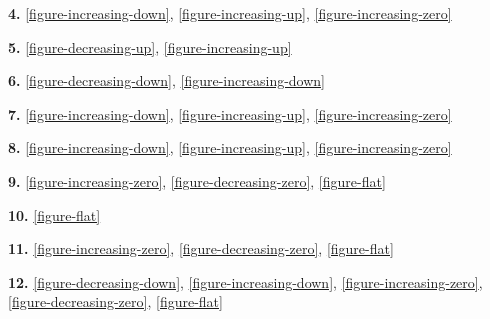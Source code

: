 \documentclass[12pt,]{book}
\theoremstyle{plain}
\theoremstyle{definition}
\numberwithin{equation}{section}
\begin{document}
                \par\smallskip
\noindent\textbf{4.}\quad{}
                    \hyperref[figure-increasing-down]{\ref{figure-increasing-down}}, \hyperref[figure-increasing-up]{\ref{figure-increasing-up}}, \hyperref[figure-increasing-zero]{\ref{figure-increasing-zero}}%

                \par\smallskip
\noindent\textbf{5.}\quad{}
                    \hyperref[figure-decreasing-up]{\ref{figure-decreasing-up}}, \hyperref[figure-increasing-up]{\ref{figure-increasing-up}}%

                \par\smallskip
\noindent\textbf{6.}\quad{}
                    \hyperref[figure-decreasing-down]{\ref{figure-decreasing-down}}, \hyperref[figure-increasing-down]{\ref{figure-increasing-down}}%

                \par\smallskip
\noindent\textbf{7.}\quad{}
                    \hyperref[figure-increasing-down]{\ref{figure-increasing-down}}, \hyperref[figure-increasing-up]{\ref{figure-increasing-up}}, \hyperref[figure-increasing-zero]{\ref{figure-increasing-zero}}%

                \par\smallskip
\noindent\textbf{8.}\quad{}
                    \hyperref[figure-increasing-down]{\ref{figure-increasing-down}}, \hyperref[figure-increasing-up]{\ref{figure-increasing-up}}, \hyperref[figure-increasing-zero]{\ref{figure-increasing-zero}}%

                \par\smallskip
\noindent\textbf{9.}\quad{}
                    \hyperref[figure-increasing-zero]{\ref{figure-increasing-zero}}, \hyperref[figure-decreasing-zero]{\ref{figure-decreasing-zero}}, \hyperref[figure-flat]{\ref{figure-flat}}%

                \par\smallskip
\noindent\textbf{10.}\quad{}
                    \hyperref[figure-flat]{\ref{figure-flat}}%

                \par\smallskip
\noindent\textbf{11.}\quad{}
                    \hyperref[figure-increasing-zero]{\ref{figure-increasing-zero}}, \hyperref[figure-decreasing-zero]{\ref{figure-decreasing-zero}}, \hyperref[figure-flat]{\ref{figure-flat}}%

                \par\smallskip
\noindent\textbf{12.}\quad{}
                    \hyperref[figure-decreasing-down]{\ref{figure-decreasing-down}}, \hyperref[figure-increasing-down]{\ref{figure-increasing-down}}, \hyperref[figure-increasing-zero]{\ref{figure-increasing-zero}}, \hyperref[figure-decreasing-zero]{\ref{figure-decreasing-zero}}, \hyperref[figure-flat]{\ref{figure-flat}}%
\end{document}
